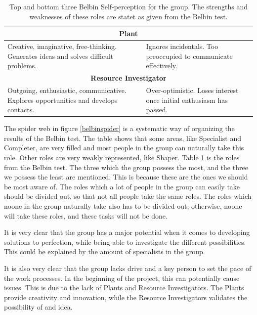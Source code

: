 \begin{table}[ht]
\begin{tabular}{|p{}|p{}|}
\multicolumn{2}{|c|}{\textbf{Plant}}                                                                                                                                         \\ \hline
Creative, imaginative, free-thinking. Generates ideas and solves difficult problems.        & Ignores incidentals. Too preoccupied to communicate effectively.             \\ \hline
\multicolumn{2}{|c|}{\textbf{Resource Investigator}}                                                                                                                         \\ \hline
Outgoing, enthusiastic, communicative. Explores opportunities and develops contacts.        & Over-optimistic. Loses interest once initial enthusiasm has passed.          \\ \hline
\end{tabular}
\caption{Top and bottom three Belbin Self-perception for the group. The strengths and weaknesses of these roles are statet as given from the Belbin test.}
\label{belbintable}
\end{table}


The spider web in figure \ref{belbinspider} is a systematic way of organizing the results of the Belbin test. The table shows that some areas, like Specialist and Completer, are very filled and most people in the group can naturally take this role. Other roles are very weakly represented, like Shaper. 
Table \ref{belbintable} is the roles from the Belbin test. The three which the group possess the most, and the three we possess the least are mentioned. This is because these are the ones we should be most aware of. 
The roles which a lot of people in the group can easily take should be divided out, so that not all people take the same roles. The roles which noone in the group naturally take also has to be divided out, otherwise, noone will take these roles, and these tasks will not be done. 


It is very clear that the group has a major potential when it comes to developing solutions to perfection, while being able to investigate the different possibilities. This could be explained by the amount of specialists in the group.

It is also very clear that the group lacks drive and a key person to set the pace of the work processes. In the beginning of the project, this can potentially cause issues. This is due to the lack of Plants and Resource Investigators. The Plants provide creativity and innovation, while the Resource Investigators validates the possibility of and idea.


